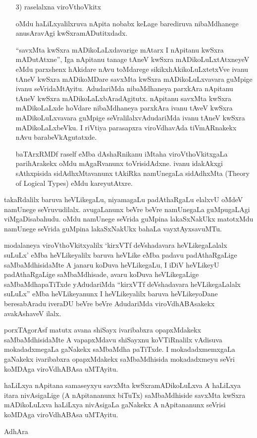 \begin{itemize}
\item[{\rm 3)}] raselalxna viroVthoVkitx

oMdu haLiLxyalilxruva nApita nobabx keLage barediruva nibaMdhanege anusAra\-vAgi kwSxramADutitxdadx.

``savxMta kwSxra mADikoLaLxdavarige mAtarx I nApitanu kwSxra mADutAtxne'', Iga nApitanu tanage tAneV kwSxra mADikoLuLxtAtxneyeV eMdu parxshenx hAkidare nAvu toMdarege sikikxhAkikoLuLxtetxVve ivanu tAneV kwSxra mADikoMDare savxMta kwSxra mADikoLuLxvavara guMpige ivanu seVridaMtAyitu. AdudariMda nibaMdhaneya parxkAra nApitanu tAneV kwSxra mADikoLaLxbAradAgitutx. nApitanu savxMta kwSxra mADikoLaLxde hoVdare nibaMdhaneya parxkAra ivanu tAveV kwSxra mADikoLuLxvavara guMpige seVralilalxvAdudariMda ivanu tAneV kwSxra mADikoLaLxbeVku. I riVtiya parasapxra viroVdhavAda tiVmARnakekx nAvu barabeVkAgutatxde.

baTArxRMDf raself eMba dAshaRnikanu iMtaha viroVthoVkitxgaLa parihArakekx oMdu mAgaRvanunx toVrisidAdxne. ivanu idakAkxgi sAthxpisida sidAdhxMtavanunx tAkiRka namUnegaLa sidAdhxMta {\rm (Theory of Logical Types)} eMdu kareyutAtxre.
\end{itemize}

takaRdalilx baruva heVLikegaLu, niyamagaLu padAthaRgaLu elalxvU oMdeV namUnege seVruvudilalx. avugaLanunx beVre beVre namUnegaLa guMpugaLAgi viMgaDisabahudu. oMdu namUnege seVrida guMpina lakaSxNakUkx matotxMdu namUnege seVrida guMpina lakaSxNakUkx bahaLa vayxtAyxsavuMTu.

modalaneya viroVthoVkitxyalilx `kirxVTf deVshadavara heVLikegaLalalx suLuLx' eMba heVLikeyalilx baruva heVLike eMba padavu padAthaRgaLige saMbaMdhisidaMte A janaru koDuva heVLikegaLu, I iDiV heVLikeyU padAthaRgaLige saMbaMdhisade, avaru koDuva heVLikegaLige saMbaMdhapaTiTxde yAdudariMda ``kirxVTf deVshadavara heVLikegaLalalx suLuLx'' eMba heVLikeyanunx I heVLikeyalilx baruva heVLikeyoDane beresabAradu iveraDU beVre beVre AdudariMda viroVdhABAsakekx avakAshaveV ilalx.

porxTAgorAsf matutx avana shiSayx ivaribabxra opapxMdakekx saMbaMdhisidaMte A vapapxMdavu shiSayxnu koVTiRnalilx vAdisuva mokadadxmegaLa gaNakekx saMbaMdha paTiTxde. I mokadadxmemxgaLa gaNakekx ivaribabxra opapxMdakekx saMbaMdhisida mokadadxmeyu seVri koMDAga viroVdhABAsa uMTAyitu.

haLiLxya nApitana samaseyxyu savxMta kwSxramADikoLuLxva A haLiLxya itara nivAsigaLige (A nApitananunx biTuTx) saMbaMdhiside savxMta kwSxra mADikoLuLxva haLiLxya nivAsigaLa gaNakekx A nApitananunx seVrisi koMDAga viroVdhABAsa uMTAyitu.
\begin{flushright}
AdhAra
\end{flushright}
